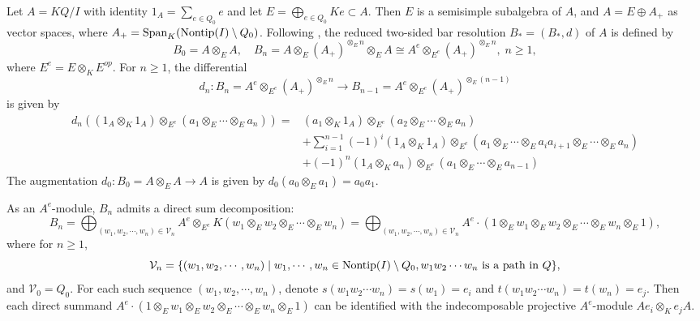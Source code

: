 \documentclass[10pt, reqno]{amsart}
\theoremstyle{definition}
\theoremstyle{remark}
\numberwithin{equation}{section}
\begin{document}
Let \(A = KQ/I\) with identity $1_A=\sum_{e\in Q_0}e$ and let \(E = \bigoplus_{e \in Q_0} Ke \subset A\). 
Then \(E\) is a semisimple subalgebra of \(A\), and \(A = E \oplus A_+\) as vector spaces, where \(A_+ = \mathrm{Span}_K(\mathrm{Nontip}(I)\setminus Q_0)\).
Following \cite[Lemma 2.1]{Cib90}, the reduced two-sided bar resolution \(B_*=(B_*, d)\) of \(A\) is defined by
\[B_0 = A \otimes_E A,\quad B_n = A \otimes_E (A_+)^{\otimes_E n} \otimes_E A \cong A^e \otimes_{E^e} (A_+)^{\otimes_E n},\; n \geq 1,\]
 where \(E^e= E \otimes_K E^{op}\). For  $n\ge 1$, the differential 
 $$d_n: B_n=A^e \otimes_{E^e} (A_+)^{\otimes_E n} \to B_{n-1}=A^e \otimes_{E^e} (A_+)^{\otimes_E (n-1)}$$
 is given by
 \begin{equation}
\begin{split}
d_n((1_A\otimes_K 1_A)\otimes_{E^e}(a_1\otimes_E \cdots \otimes_E a_n) ) =&  (a_1 \otimes_K 1_A)\otimes_{E^e} (a_2\otimes_E \cdots \otimes_E a_n) \\
&+ \sum_{i=1}^{n-1} (-1)^i (1_A\otimes_K 1_A)\otimes_{E^e} (a_1\otimes_E \cdots \otimes_E a_i a_{i+1}\otimes_E \cdots \otimes_E a_n) \\
&+ (-1)^n (1_A \otimes_K a_n)\otimes_{E^e} (a_1\otimes_E \cdots \otimes_E a_{n-1}) 
\end{split}
\end{equation}
The augmentation  \( d_0 : B_0=A \otimes_E A \to A \) is given by \( d_0(a_0\otimes_E a_1)=a_0a_1\).

As an \(A^e\)-module, \(B_n\) admits a direct sum decomposition:
\[ B_n = \bigoplus_{(w_1, w_2, \cdots, w_n)\in \mathcal{V}_n } A^e \otimes_{E^e} K( w_1 \otimes_E w_2 \otimes_E \cdots \otimes_E w_n) = \bigoplus_{(w_1, w_2, \cdots, w_n)\in \mathcal{V}_n } A^e \cdot (1 \otimes_E w_1 \otimes_E w_2 \otimes_E \cdots \otimes_E w_n \otimes_E 1), \]
where for $n\ge 1$,
\[\mathcal{V}_n = \{ (w_1, w_2, \cdots, w_n) \mid 
w_1, \cdots, w_n \in \mathrm{Nontip}(I) \setminus Q_0,  w_1 w_2 \cdots w_n \text{ is a path in } Q \},\] 
and \(\mathcal{V}_0=Q_0\).
For each such sequence \((w_1, w_2, \cdots, w_n)\), denote \(s(w_1w_2\cdots w_n) = s(w_1)= e_i\) and \(t(w_1w_2\cdots w_n) = t(w_n) = e_j\). Then each direct summand \( A^e \cdot (1 \otimes_E w_1 \otimes_E w_2 \otimes_E \cdots \otimes_E w_n \otimes_E 1)\) can be identified with the indecomposable projective \(A^e\)-module \(Ae_i \otimes_K e_jA\). 
\end{document}
